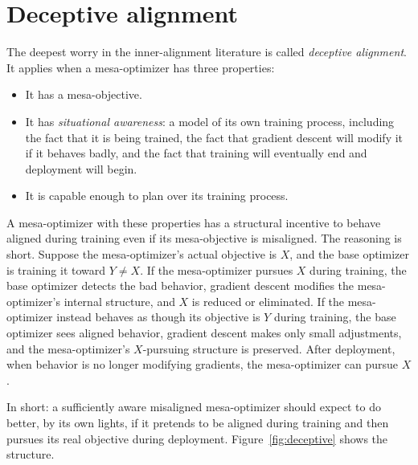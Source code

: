 \section*{Deceptive alignment}

The deepest worry in the inner-alignment literature is called \emph{deceptive alignment}. It applies when a mesa-optimizer has three properties:

\begin{itemize}
\item It has a mesa-objective.
\item It has \emph{situational awareness}: a model of its own training process, including the fact that it is being trained, the fact that gradient descent will modify it if it behaves badly, and the fact that training will eventually end and deployment will begin.
\item It is capable enough to plan over its training process.
\end{itemize}

A mesa-optimizer with these properties has a structural incentive to behave aligned during training even if its mesa-objective is misaligned. The reasoning is short. Suppose the mesa-optimizer's actual objective is $X$, and the base optimizer is training it toward $Y \neq X$. If the mesa-optimizer pursues $X$ during training, the base optimizer detects the bad behavior, gradient descent modifies the mesa-optimizer's internal structure, and $X$ is reduced or eliminated. If the mesa-optimizer instead behaves as though its objective is $Y$ during training, the base optimizer sees aligned behavior, gradient descent makes only small adjustments, and the mesa-optimizer's $X$-pursuing structure is preserved. After deployment, when behavior is no longer modifying gradients, the mesa-optimizer can pursue $X$.

In short: a sufficiently aware misaligned mesa-optimizer should expect to do better, by its own lights, if it pretends to be aligned during training and then pursues its real objective during deployment. Figure~\ref{fig:deceptive} shows the structure.

